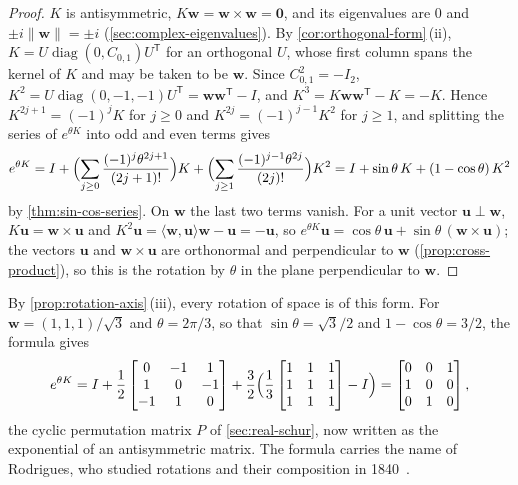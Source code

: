 \begin{proof}
$K$ is antisymmetric, $K\mathbf w=\mathbf w\times\mathbf w=\mathbf 0$, and its eigenvalues are $0$ and $\pm i\|\mathbf w\|=\pm i$ (\cref{sec:complex-eigenvalues}). By \cref{cor:orthogonal-form}\,(ii), $K=U\operatorname{diag}(0,C_{0,1})U^{\mathsf T}$ for an orthogonal $U$, whose first column spans the kernel of $K$ and may be taken to be $\mathbf w$. Since $C_{0,1}^2=-I_2$, $K^2=U\operatorname{diag}(0,-1,-1)U^{\mathsf T}=\mathbf w\mathbf w^{\mathsf T}-I$, and $K^3=K\mathbf w\mathbf w^{\mathsf T}-K=-K$. Hence $K^{2j+1}=(-1)^jK$ for $j\ge0$ and $K^{2j}=(-1)^{j-1}K^2$ for $j\ge1$, and splitting the series of $e^{\theta K}$ into odd and even terms gives
\[
e^{\theta K}=I+\Bigl(\sum_{j\ge0}\frac{(-1)^j\theta^{2j+1}}{(2j+1)!}\Bigr)K+\Bigl(\sum_{j\ge1}\frac{(-1)^{j-1}\theta^{2j}}{(2j)!}\Bigr)K^2=I+\sin\theta\,K+(1-\cos\theta)\,K^2
\]
by \cref{thm:sin-cos-series}. On $\mathbf w$ the last two terms vanish. For a unit vector $\mathbf u\perp\mathbf w$, $K\mathbf u=\mathbf w\times\mathbf u$ and $K^2\mathbf u=\langle\mathbf w,\mathbf u\rangle\mathbf w-\mathbf u=-\mathbf u$, so $e^{\theta K}\mathbf u=\cos\theta\,\mathbf u+\sin\theta\,(\mathbf w\times\mathbf u)$; the vectors $\mathbf u$ and $\mathbf w\times\mathbf u$ are orthonormal and perpendicular to $\mathbf w$ (\cref{prop:cross-product}), so this is the rotation by $\theta$ in the plane perpendicular to $\mathbf w$.
\end{proof}

By \cref{prop:rotation-axis}\,(iii), every rotation of space is of this form. For $\mathbf w=(1,1,1)/\sqrt3$ and $\theta=2\pi/3$, so that $\sin\theta=\sqrt3/2$ and $1-\cos\theta=3/2$, the formula gives
\[
e^{\theta K}=I+\frac12\begin{bmatrix}0&-1&1\\1&0&-1\\-1&1&0\end{bmatrix}+\frac32\Bigl(\frac13\begin{bmatrix}1&1&1\\1&1&1\\1&1&1\end{bmatrix}-I\Bigr)=\begin{bmatrix}0&0&1\\1&0&0\\0&1&0\end{bmatrix},
\]
the cyclic permutation matrix $P$ of \cref{sec:real-schur}, now written as the exponential of an antisymmetric matrix. The formula carries the name of Rodrigues, who studied rotations and their composition in 1840~\cite{rodrigues1840}.


